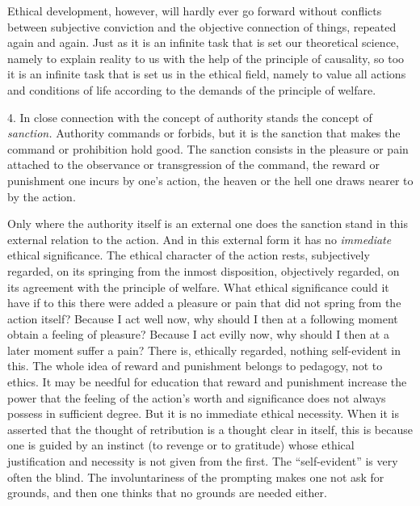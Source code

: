 \documentclass[12pt,a4paper,openany]{book}
\newcommand{\opage}[1]{\marginnote{\footnotesize\textit{[#1]}}}
\begin{document}
Ethical development, however, will hardly ever go forward without conflicts between subjective conviction
and the objective connection of things, repeated again and again. Just as it is an infinite task that is
set our theoretical science, namely to explain reality to us with the help of the principle of
causality, so too it is an infinite task that is set us in the ethical field, namely to value all actions
and conditions of life according to the demands of the principle of welfare.

4. In close connection with the concept of authority stands the concept of \textit{sanction.} Authority
commands or forbids, but it is the sanction that makes the command or prohibition hold good. The sanction
consists in the pleasure or pain attached to the observance or transgression of the command, the reward
or punishment one incurs by one's action, the heaven or the hell one draws nearer to by the action.

Only where the authority itself is an external one does the sanction stand in this external relation to
the action. And in this external form it has no \textit{immediate} ethical significance. The ethical
character of the action rests, subjectively regarded, on its springing from the inmost disposition,
objectively regarded, on its agreement with the principle of welfare. What ethical significance could it
have if to this there were added a pleasure or pain that did not spring from the action itself? Because I
act well now, why should I then at a following moment obtain a feeling of pleasure? Because I act evilly
now, why should I then at a later moment suffer a pain? There is, ethically regarded, nothing
self-evident in this. The whole idea of reward and punishment belongs to pedagogy, not to ethics. It may
be needful for education that reward and punishment increase the power that the feeling of the action's
worth and significance does not always possess in sufficient degree. But it is no immediate ethical
necessity. When it is asserted that the thought of retribution is a thought clear
\opage{97}in itself, this is because one is guided by an instinct (to revenge or to gratitude) whose ethical
justification and necessity is not given from the first. The ``self-evident'' is very often the blind.
The involuntariness of the prompting makes one not ask for grounds, and then one thinks that no grounds
are needed either.
\end{document}
